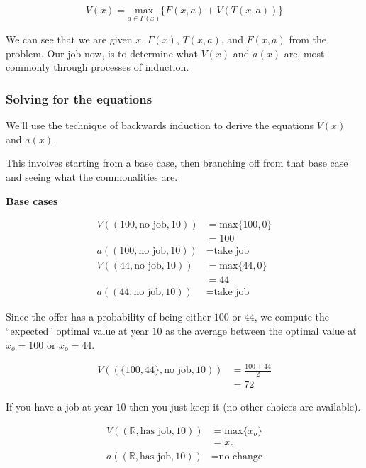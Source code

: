 \documentclass[a4paper, 12pt]{article}
\begin{document}
\[
  V(x)=\underset{a \in \Gamma(x)}{\text{max}}\{F(x,a)+V(T(x,a))\}
\]

We can see that we are given $x$, $\Gamma(x)$, $T(x, a)$, and $F(x, a)$ from the problem. Our job now, is to determine what $V(x)$ and $a(x)$ are, most commonly through processes of induction.

\subsubsection{Solving for the equations}

We'll use the technique of backwards induction to derive the equations $V(x)$ and $a(x)$.

This involves starting from a base case, then branching off from that base case and seeing what the commonalities are.

\textbf{Base cases}

\[
\begin{aligned}
  V((100, \text{no job}, 10)) &= \text{max}\{100, 0\} \\
                              &= 100 \\
  a((100, \text{no job}, 10)) &= \text{take job} \\
  V((44, \text{no job}, 10)) &= \text{max}\{44, 0\} \\
                             &= 44 \\
  a((44, \text{no job}, 10)) &= \text{take job}
\end{aligned}
\]

Since the offer has a probability of being either $100$ or $44$, we compute the ``expected'' optimal value at year $10$ as the average between the optimal value at $x_{o}=100$ or $x_{o}=44$.

\[
\begin{aligned}
  V((\{100, 44\}, \text{no job}, 10)) &= \frac{100+44}{2} \\
                                                &= 72
\end{aligned}
\]

If you have a job at year $10$ then you just keep it (no other choices are available).

\[
\begin{aligned}
  V((\mathbb{R}, \text{has job}, 10)) &= \text{max}\{x_{o}\} \\
                                                &= x_{o} \\
  a((\mathbb{R}, \text{has job}, 10)) &= \text{no change}
\end{aligned}
\]
\end{document}

